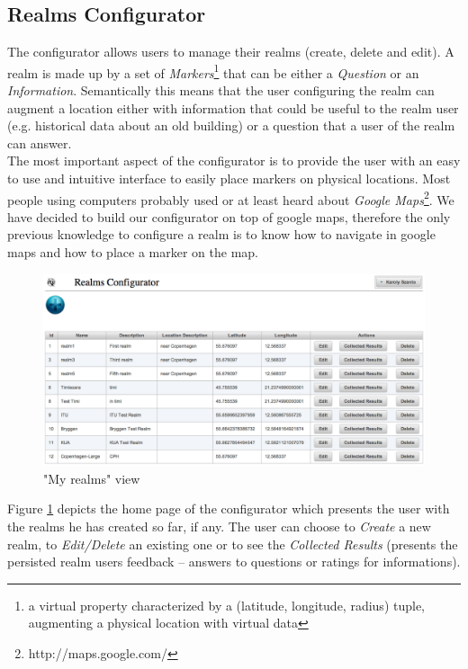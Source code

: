 \subsection{Realms Configurator}
The configurator allows users to manage their realms (create, delete and edit). A realm is made up by a set of \emph{Markers}\footnote{a virtual property characterized by a (latitude, longitude, radius) tuple, augmenting a physical location with virtual data} that can be either a \emph{Question} or an \emph{Information}. Semantically this means that the user configuring the realm can augment a location either with information that could be useful to the realm user (e.g. historical data about an old building)  or a question that a user of the realm can answer.
\\

\noindent The most important aspect of the configurator is to provide the user with an easy to use and intuitive interface to easily place markers on physical locations. Most people using computers probably used or at least heard about \emph{Google Maps}\footnote{http://maps.google.com/}. We have decided to build our configurator on top of google maps, therefore the only previous knowledge to configure a realm is to know how to navigate in google maps and how to place a marker on the map.\\
\begin{figure}[H] 
	\centering
	\includegraphics[width=\linewidth]{fig/my_realms.png}
	\caption{"My realms" view}
	\label{fig.my_realms}
\end{figure}

\noindent Figure \ref{fig.my_realms} depicts the home page of the configurator which presents the user with the realms he has created so far, if any. The user can choose to \emph{Create} a new realm, to \emph{Edit/Delete} an existing one or to see the \emph{Collected Results} (presents the persisted realm users feedback -- answers to questions or ratings for informations).
\\


